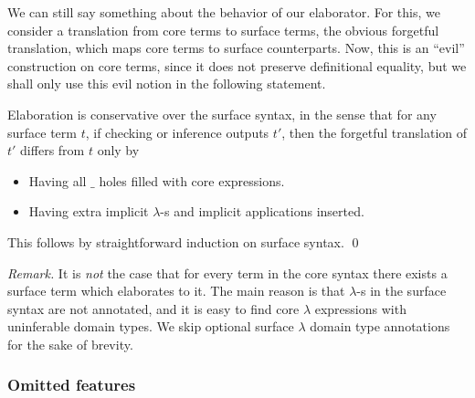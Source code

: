 \documentclass[acmsmall,review,anonymous,prologue,dvipsnames]{acmart}\settopmatter{printfolios=true,printccs=false,printacmref=false}
\theoremstyle{remark}
\begin{document}
We can still say something about the behavior of our elaborator. For this, we
consider a translation from core terms to surface terms, the obvious forgetful
translation, which maps core terms to surface counterparts. Now, this is an
``evil'' construction on core terms, since it does not preserve definitional
equality, but we shall only use this evil notion in the following statement.

\begin{theorem}[Conservativity]\label{thm:conservativity}
Elaboration is conservative over the surface syntax, in the sense that for any
surface term $t$, if checking or inference outputs $t'$, then the forgetful
translation of $t'$ differs from $t$ only by
  \begin{itemize}
    \item Having all $\_$ holes filled with core expressions.
    \item Having extra implicit $\lambda$-s and implicit applications inserted.
  \end{itemize}
This follows by straightforward induction on surface syntax. \qed
\end{theorem}

\emph{Remark.} It is \emph{not} the case that for every term in the core syntax
there exists a surface term which elaborates to it. The main reason is that
$\lambda$-s in the surface syntax are not annotated, and it is easy to find core
$\lambda$ expressions with uninferable domain types. We skip optional surface
$\lambda$ domain type annotations for the sake of brevity.

\subsubsection{Omitted features}
\end{document}
